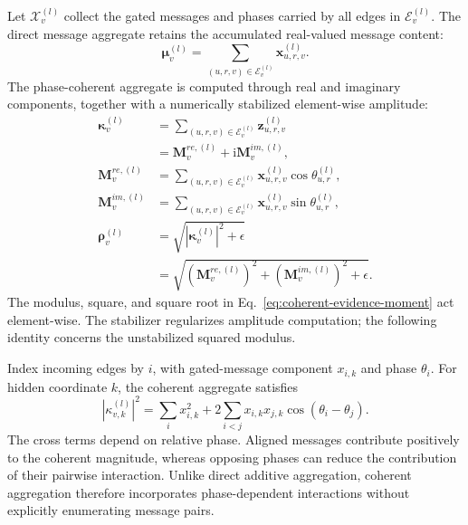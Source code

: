 \documentclass[a4paper,fleqn]{cas-dc}
\begin{document}
Let $\mathcal{X}_{v}^{(l)}$ collect the gated messages and phases carried by all edges in $\mathcal{E}_{v}^{(l)}$. The direct message aggregate retains the accumulated real-valued message content:
\begin{equation}
\boldsymbol{\mu}_{v}^{(l)}
=
\sum_{(u,r,v)\in\mathcal{E}_{v}^{(l)}}
\mathbf{x}_{u,r,v}^{(l)}.
\label{eq:direct-evidence-moment}
\end{equation}
The phase-coherent aggregate is computed through real and imaginary components, together with a numerically stabilized element-wise amplitude:
\begin{equation}
\begin{aligned}
\boldsymbol{\kappa}_{v}^{(l)}
&=\sum_{(u,r,v)\in\mathcal{E}_{v}^{(l)}}\mathbf{z}_{u,r,v}^{(l)}\\
&=\mathbf{M}_{v}^{re,(l)}+\mathrm{i}\mathbf{M}_{v}^{im,(l)},\\
\mathbf{M}_{v}^{re,(l)}
&=\sum_{(u,r,v)\in\mathcal{E}_{v}^{(l)}}
\mathbf{x}_{u,r,v}^{(l)}\cos\theta_{u,r}^{(l)},\\
\mathbf{M}_{v}^{im,(l)}
&=\sum_{(u,r,v)\in\mathcal{E}_{v}^{(l)}}
\mathbf{x}_{u,r,v}^{(l)}\sin\theta_{u,r}^{(l)},\\
\boldsymbol{\rho}_{v}^{(l)}
&=\sqrt{\left|\boldsymbol{\kappa}_{v}^{(l)}\right|^2+\epsilon}\\
&=\sqrt{\left(\mathbf{M}_{v}^{re,(l)}\right)^2
+\left(\mathbf{M}_{v}^{im,(l)}\right)^2+\epsilon}.
\end{aligned}
\label{eq:coherent-evidence-moment}
\end{equation}
The modulus, square, and square root in Eq.~\eqref{eq:coherent-evidence-moment} act element-wise. The stabilizer regularizes amplitude computation; the following identity concerns the unstabilized squared modulus.

Index incoming edges by $i$, with gated-message component $x_{i,k}$ and phase $\theta_i$. For hidden coordinate $k$, the coherent aggregate satisfies
\begin{equation}
\left|\kappa_{v,k}^{(l)}\right|^2
=
\sum_i x_{i,k}^{2}
+
2\sum_{i<j}
x_{i,k}x_{j,k}
\cos\left(\theta_i-\theta_j\right).
\label{eq:phase-dependent-interaction}
\end{equation}
The cross terms depend on relative phase. Aligned messages contribute positively to the coherent magnitude, whereas opposing phases can reduce the contribution of their pairwise interaction. Unlike direct additive aggregation, coherent aggregation therefore incorporates phase-dependent interactions without explicitly enumerating message pairs.
\end{document}
